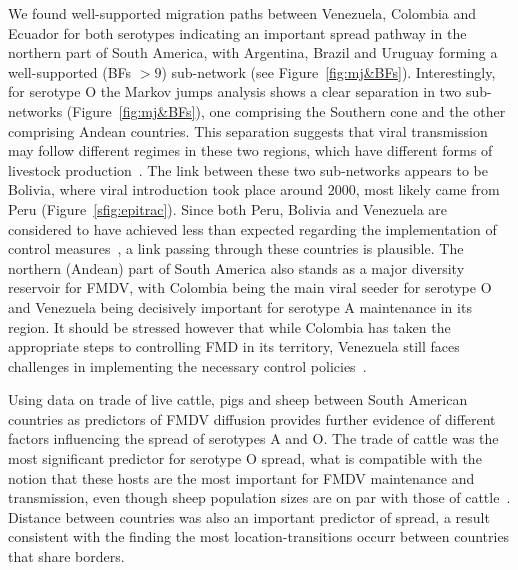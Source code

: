 \documentclass[10pt]{article}
\begin{document}
We found well-supported migration paths between Venezuela, Colombia and Ecuador for both serotypes indicating an important spread pathway in the northern part of South America, with Argentina, Brazil and Uruguay forming a well-supported (BFs $> 9$) sub-network (see Figure~\ref{fig:mj&BFs}).
Interestingly, for serotype O the Markov jumps analysis shows a clear separation in two sub-networks (Figure~\ref{fig:mj&BFs}), one comprising the Southern cone and the other comprising Andean countries.
This separation suggests that viral transmission may follow different regimes in these two regions, which have different forms of livestock production~\cite{Saraiva2003,Naranjo2013}.
The link between these two sub-networks appears to be Bolivia, where viral introduction took place around $2000$, most likely came from Peru (Figure~\ref{sfig:epitrac}). 
Since both Peru, Bolivia and Venezuela are considered to have achieved less than expected regarding the implementation of control measures~\cite{Naranjo2013}, a link passing through these countries is plausible.
The northern (Andean) part of South America also stands as a major diversity reservoir for FMDV, with Colombia being the main viral seeder for serotype O and Venezuela being decisively important for serotype A maintenance in its region.
It should be stressed however that while Colombia has taken the appropriate steps to controlling FMD in its territory, Venezuela still faces challenges in implementing the necessary control policies~\cite{Naranjo2013}.

Using data on trade of live cattle, pigs and sheep between South American countries as predictors of FMDV diffusion provides further evidence of different factors influencing the spread of serotypes A and O.
The trade of cattle was the most significant predictor for serotype O spread, what is compatible with the notion that these hosts are the most important for FMDV maintenance and transmission, even though sheep population sizes are on par with those of cattle~\cite{Saraiva2003}.
Distance between countries was also an important predictor of spread, a result consistent with the finding the most location-transitions occurr between countries that share borders.
\end{document}
